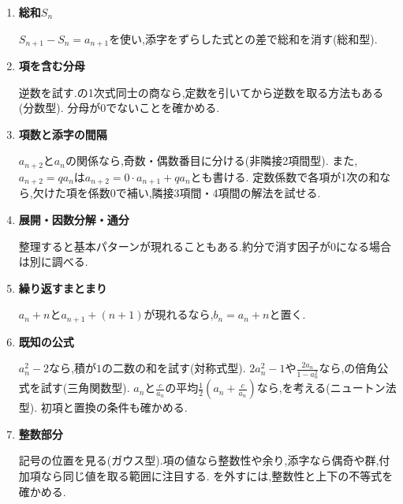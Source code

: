 \begingroup
  \medskip
  \begin{enumerate}
    \item \textbf{総和$S_n$}

      $S_{n+1}-S_n=a_{n+1}$を使い,添字をずらした式との差で総和を消す(総和型).

    \item \textbf{項を含む分母}

      逆数を試す.の1次式同士の商なら,定数を引いてから逆数を取る方法もある(分数型).
      分母が0でないことを確かめる.

    \item \textbf{項数と添字の間隔}

      $a_{n+2}$と$a_n$の関係なら,奇数・偶数番目に分ける(非隣接2項間型).
      また,$a_{n+2}=qa_n$は$a_{n+2}=0\cdot a_{n+1}+qa_n$とも書ける.
      定数係数で各項が1次の和なら,欠けた項を係数$0$で補い,隣接3項間・4項間の解法を試せる.

    \item \textbf{展開・因数分解・通分}

      整理すると基本パターンが現れることもある.約分で消す因子が0になる場合は別に調べる.

    \item \textbf{繰り返すまとまり}

      $a_n+n$と$a_{n+1}+(n+1)$が現れるなら,$b_n=a_n+n$と置く.

    \item \textbf{既知の公式}

      $a_n^2-2$なら,積が$1$の二数の和を試す(対称式型).
      $2a_n^2-1$や$\frac{2a_n}{1-a_n^2}$なら,の倍角公式を試す(三角関数型).
      $a_n$と$\frac{c}{a_n}$の平均$\frac12\left(a_n+\frac{c}{a_n}\right)$なら,を考える(ニュートン法型).
      初項と置換の条件も確かめる.


    \item \textbf{整数部分}

      記号の位置を見る(ガウス型).項の値なら整数性や余り,添字なら偶奇や群,付加項なら同じ値を取る範囲に注目する.
      を外すには,整数性と上下の不等式を確かめる.
  \end{enumerate}

